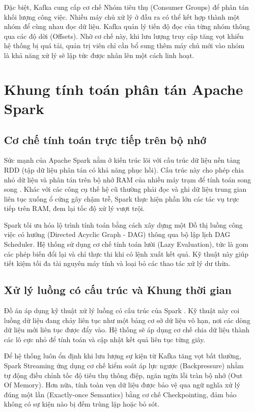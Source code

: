 \documentclass[12pt,a4paper]{report}
\begin{document}
Đặc biệt, Kafka cung cấp cơ chế Nhóm tiêu thụ (Consumer Groups) để phân tán khối lượng công việc. Nhiều máy chủ xử lý ở đầu ra có thể kết hợp thành một nhóm để cùng nhau đọc dữ liệu. Kafka quản lý tiến độ đọc của từng nhóm thông qua các độ dời (Offsets). Nhờ cơ chế này, khi lưu lượng truy cập tăng vọt khiến hệ thống bị quá tải, quản trị viên chỉ cần bổ sung thêm máy chủ mới vào nhóm là khả năng xử lý sẽ lập tức được nhân lên một cách linh hoạt.

\section{Khung tính toán phân tán Apache Spark}
\subsection{Cơ chế tính toán trực tiếp trên bộ nhớ}
Sức mạnh của Apache Spark nằm ở kiến trúc lõi với cấu trúc dữ liệu nền tảng RDD (tập dữ liệu phân tán có khả năng phục hồi). Cấu trúc này cho phép chia nhỏ dữ liệu và phân tán trên bộ nhớ RAM của nhiều máy trạm để tính toán song song \cite{zaharia2013}. Khác với các công cụ thế hệ cũ thường phải đọc và ghi dữ liệu trung gian liên tục xuống ổ cứng gây chậm trễ, Spark thực hiện phần lớn các tác vụ trực tiếp trên RAM, đem lại tốc độ xử lý vượt trội.

Spark tối ưu hóa lộ trình tính toán bằng cách xây dựng một Đồ thị luồng công việc có hướng (Directed Acyclic Graph - DAG) thông qua bộ lập lịch DAG Scheduler. Hệ thống sử dụng cơ chế tính toán lười (Lazy Evaluation), tức là gom các phép biến đổi lại và chỉ thực thi khi có lệnh xuất kết quả. Kỹ thuật này giúp tiết kiệm tối đa tài nguyên máy tính và loại bỏ các thao tác xử lý dư thừa.

\subsection{Xử lý luồng có cấu trúc và Khung thời gian}
Đồ án áp dụng kỹ thuật xử lý luồng có cấu trúc của Spark \cite{spark_doc}. Kỹ thuật này coi luồng dữ liệu đang chảy liên tục như một bảng cơ sở dữ liệu vô hạn, nơi các dòng dữ liệu mới liên tục được đẩy vào. Hệ thống sẽ áp dụng cơ chế chia dữ liệu thành các lô cực nhỏ để tính toán và cập nhật kết quả liên tục từng giây.

Để hệ thống luôn ổn định khi lưu lượng sự kiện từ Kafka tăng vọt bất thường, Spark Streaming ứng dụng cơ chế kiểm soát áp lực ngược (Backpressure) nhằm tự động điều chỉnh tốc độ tiêu thụ thông điệp, ngăn ngừa lỗi tràn bộ nhớ (Out Of Memory). Hơn nữa, tính toàn vẹn dữ liệu được bảo vệ qua ngữ nghĩa xử lý đúng một lần (Exactly-once Semantics) bằng cơ chế Checkpointing, đảm bảo không có sự kiện nào bị đếm trùng lặp hoặc bỏ sót.
\end{document}
